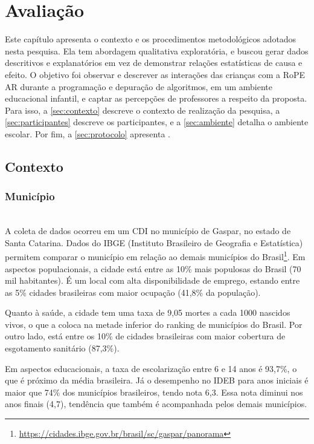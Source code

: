 \chapter{Avaliação}
\label{c_avaliacao}
Este capítulo apresenta o contexto e os procedimentos metodológicos adotados nesta pesquisa. Ela tem abordagem qualitativa exploratória, e buscou gerar dados descritivos e explanatórios em vez de demonstrar relações estatísticas de causa e efeito.
O objetivo foi observar e descrever as interações das crianças com a RoPE AR durante a programação e depuração de algoritmos, em um ambiente educacional infantil, e captar as percepções de professores a respeito da proposta. Para isso, a \autoref{sec:contexto} descreve o contexto de realização da pesquisa, a \autoref{sec:participantes} descreve os participantes, e a \autoref{sec:ambiente} detalha o ambiente escolar. Por fim, a \autoref{sec:protocolo} apresenta .

\section{Contexto}
\label{sec:contexto}
\subsection{Município}\\
A coleta de dados ocorreu em um \ac{CDI} no município de Gaspar, no estado de Santa Catarina. Dados do IBGE (Instituto Brasileiro de Geografia e Estatística) permitem comparar o município em relação ao demais municípios do Brasil\footnote{\url{https://cidades.ibge.gov.br/brasil/sc/gaspar/panorama}}. Em aspectos populacionais, a cidade está entre as 10\% mais populosas do Brasil (70 mil habitantes). É um local com alta disponibilidade de emprego, estando entre as 5\% cidades brasileiras com maior ocupação (41,8\% da população). 

Quanto à saúde, a cidade tem uma taxa de 9,05 mortes a cada 1000 nascidos vivos, o que a coloca na metade inferior do ranking de municípios do Brasil. Por outro lado, está entre os 10\% de cidades brasileiras com maior cobertura de esgotamento sanitário (87,3\%).

Em aspectos educacionais, a taxa de escolarização entre 6 e 14 anos é 93,7\%, o que é próximo da média brasileira. Já o desempenho no \ac{IDEB} para anos iniciais é maior que 74\% dos municípios brasileiros, tendo nota 6,3. Essa nota diminui nos anos finais (4,7), tendência que também é acompanhada pelos demais municípios. 

